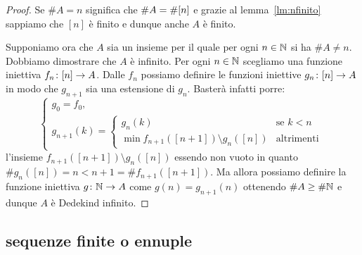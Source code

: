 \begin{proof}
Se $\#A = n$ significa che $\#A = \#{\left[ n \right]}$ e 
grazie al lemma~\ref{lm:nfinito} sappiamo che $[n]$ è finito 
e dunque anche $A$ è finito.

Supponiamo ora che $A$ sia un insieme per il quale per ogni $n\in {\mathbb N}$ 
si ha $\#A \neq n$. Dobbiamo dimostrare che $A$ è infinito.
Per ogni $n\in {\mathbb N}$ scegliamo
%
una funzione iniettiva $f_n\colon{\left[ n \right]}\to A$.
Dalle $f_n$ possiamo definire le funzioni iniettive $g_n\colon {\left[ n \right]}\to A$
in modo che $g_{n+1}$ sia una estensione di $g_n$.
Basterà infatti porre:
\[
  \begin{cases}
  g_0 = f_0,\\
  g_{n+1}(k) = \begin{cases}
    g_n(k) &\text{se $k<n$}\\
    \min f_{n+1}([n+1])\setminus g_n([n]) & \text{altrimenti}
    \end{cases}
  \end{cases}
\]
l'insieme $f_{n+1}([n+1])\setminus g_n([n])$ essendo non vuoto 
in quanto $\# g_n([n]) = n < n+1 = \# f_{n+1}([n+1])$.
Ma allora possiamo definire la funzione iniettiva $g\colon {\mathbb N} \to A$
come $g(n) = g_{n+1}(n)$ ottenendo $\#A \ge \#{\mathbb N}$ e dunque $A$ 
è Dedekind infinito.
\end{proof}

\subsection{sequenze finite o ennuple}

